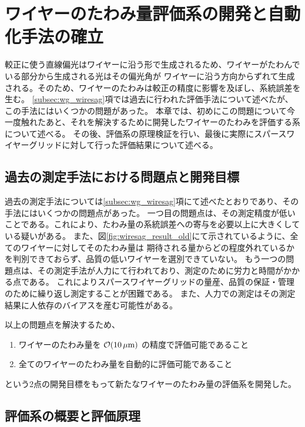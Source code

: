 \documentclass[../../main.tex]{subfiles}
\begin{document}
\chapter{ワイヤーのたわみ量評価系の開発と自動化手法の確立}
\label{chap:wiresag}
較正に使う直線偏光はワイヤーに沿う形で生成されるため、ワイヤーがたわんでいる部分から生成される光はその偏光角が
ワイヤーに沿う方向からずれて生成される。そのため、ワイヤーのたわみは較正の精度に影響を及ぼし、系統誤差を生む。
\ref{subsec:wg_wiresag}項では過去に行われた評価手法について述べたが、この手法にはいくつかの問題があった。
本章では、初めにこの問題について今一度触れたあと、それを解決するために開発したワイヤーのたわみを評価する系について述べる。
その後、評価系の原理検証を行い、最後に実際にスパースワイヤーグリッドに対して行った評価結果について述べる。

\section{過去の測定手法における問題点と開発目標}

過去の測定手法については\ref{subsec:wg_wiresag}項にて述べたとおりであり、その手法にはいくつかの問題点があった。
一つ目の問題点は、その測定精度が低いことである。これにより、たわみ量の系統誤差への寄与を必要以上に大きくしている疑いがある。
また、図\ref{fig:wiresag_result_old}にて示されているように、全てのワイヤーに対してそのたわみ量は
期待される量からどの程度外れているかを判別できておらず、品質の低いワイヤーを選別できていない。
もう一つの問題点は、その測定手法が人力にて行われており、測定のために労力と時間がかかる点である。
これによりスパースワイヤーグリッドの量産、品質の保証・管理のために繰り返し測定することが困難である。
また、人力での測定はその測定結果に人依存のバイアスを産む可能性がある。

以上の問題点を解決するため、
\begin{enumerate}
    \item ワイヤーのたわみ量を $\order{\SI{10}{\mu m}}$ の精度で評価可能であること
    \item 全てのワイヤーのたわみ量を自動的に評価可能であること
\end{enumerate}
という2点の開発目標をもって新たなワイヤーのたわみ量の評価系を開発した。

\section{評価系の概要と評価原理}
\end{document}
